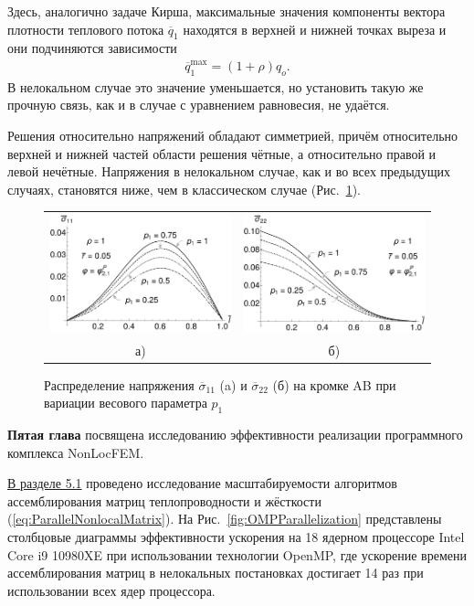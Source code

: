 Здесь, аналогично задаче Кирша, максимальные значения компоненты вектора плотности теплового потока $\overline{q}_1$ находятся в верхней и нижней точках выреза и они подчиняются зависимости
\begin{gather*}
	\overline{q}_1^{\max} = (1 + \rho) q_o.
\end{gather*}
В нелокальном случае это значение уменьшается, но установить такую же прочную связь, как и в случае с уравнением равновесия, не удаётся.

Решения относительно напряжений обладают симметрией, причём относительно верхней и нижней частей области решения чётные, а относительно правой и левой нечётные. Напряжения в нелокальном случае, как и во всех предыдущих случаях, становятся ниже, чем в классическом случае (Рис.~\ref{fig:ThermalKirshP1Variation}).

\begin{figure}[ht] \centering
	\begin{tabular}{cc}
		\includegraphics[width=0.38\linewidth]{pics/ThermalKirshSigma11VariationP1.pdf} &
		\includegraphics[width=0.38\linewidth]{pics/ThermalKirshSigma22VariationP1.pdf} \\
		а) & б)
	\end{tabular}
    \caption{Распределение напряжения $\overline{\sigma}_{11}$ (a) и $\overline{\sigma}_{22}$ (б) на кромке AB при вариации весового параметра $p_1$}
    \label{fig:ThermalKirshP1Variation}
\end{figure}

\textbf{Пятая глава} посвящена исследованию эффективности реализации программного комплекса NonLocFEM.

\underline{В разделе 5.1} проведено исследование масштабируемости алгоритмов ассемблирования матриц теплопроводности и жёсткости (\ref{eq:ParallelNonlocalMatrix}). На Рис.~\ref{fig:OMPParallelization} представлены столбцовые диаграммы эффективности ускорения на 18 ядерном процессоре Intel Core i9
10980XE при использовании технологии OpenMP, где ускорение времени ассемблирования матриц в нелокальных постановках достигает 14 раз при использовании всех ядер процессора.

